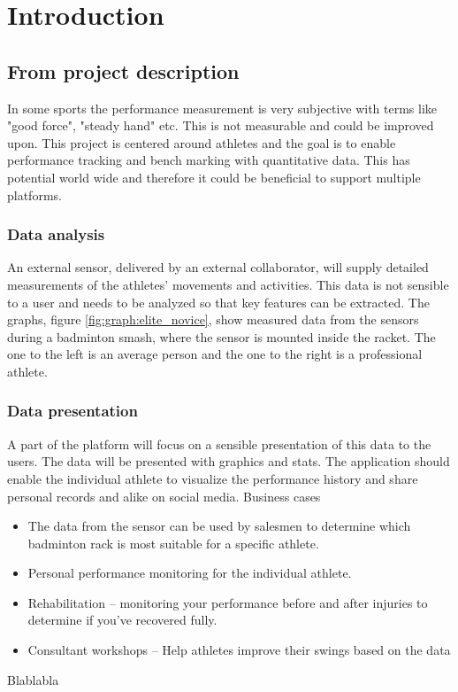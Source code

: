 \chapter{Introduction}

\section*{From project description}
In some sports the performance measurement is very subjective with terms like "good force",
"steady hand" etc. This is not measurable and could be improved upon. This project is centered
around athletes and the goal is to enable performance tracking and bench marking with
quantitative data. This has potential world wide and therefore it could be beneficial to support
multiple platforms.

\subsection*{Data analysis}
An external sensor, delivered by an external collaborator, will supply detailed measurements of the
athletes’ movements and activities. This data is not sensible to a user and needs to be analyzed
so that key features can be extracted. The graphs, figure \ref{fig:graph:elite_novice}, show measured data from the sensors
during a badminton smash, where the sensor is mounted inside the racket. The one to the left is
an average person and the one to the right is a professional athlete.


\subsection*{Data presentation}
A part of the platform will focus on a sensible presentation of this data to the users. The data will
be presented with graphics and stats. The application should enable the individual athlete to
visualize the performance history and share personal records and alike on social media.
Business cases
\begin{itemize}
	\item The data from the sensor can be used by salesmen to determine which badminton rack is most suitable for a specific athlete.
	\item Personal performance monitoring for the individual athlete.
	\item Rehabilitation – monitoring your performance before and after injuries to determine if you’ve recovered fully.
	\item Consultant workshops – Help athletes improve their swings based on the data
\end{itemize}

Blablabla
